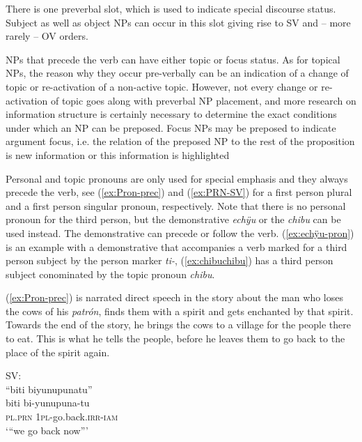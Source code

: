 There is one preverbal slot, which is used to indicate special discourse status. Subject as well as object NPs can occur in this slot giving rise to SV and – more rarely – OV orders. 

NPs that precede the verb can have either topic or focus status.  As for topical NPs, the reason why they occur pre-verbally can be an indication of a change of topic or re-activation of a non-active topic. However, not every change or re-activation of topic goes along with preverbal NP placement, and more research on information structure is certainly necessary to determine the exact conditions under which an NP can be preposed. Focus NPs may be preposed to indicate argument focus, i.e. the relation of the preposed NP to the rest of the proposition is new information or this information is highlighted \citep[cf.][228]{Lambrecht1994}

Personal and topic pronouns are only used for special emphasis and they always precede the verb, see (\ref{ex:Pron-prec}) and (\ref{ex:PRN-SV}) for a first person plural and a first person singular pronoun, respectively. Note that there is no personal pronoun for the third person, but the demonstrative \textit{echÿu} or the  \textit{chibu} can be used instead. The demonstrative can precede or follow the verb. (\ref{ex:echÿu-pron}) is an example with a demonstrative that accompanies a verb marked for a third person subject by the person marker \textit{ti-}, (\ref{ex:chibuchibu}) has a third person subject conominated by the topic pronoun \textit{chibu}.  %

(\ref{ex:Pron-prec}) is narrated direct speech in the story about the man who loses the cows of his \textit{patrón}, finds them with a spirit and gets enchanted by that spirit. Towards the end of the story, he brings the cows to a village for the people there to eat. This is what he tells the people, before he leaves them to go back to the place of the spirit again. 

\ea\label{ex:Pron-prec}
\begingl 
\glpreamble \textup{SV:}\\ “biti biyunupunatu”\\
\gla biti bi-yunupuna-tu\\ 
\textsc{pl.prn} 1\textsc{pl}-go.back.\textsc{irr}-\textsc{iam}\\ 
\glft ‘“we go back now”’\\ 
\endgl
\trailingcitation{[mxx-n151017l-1.92]}
\xe

